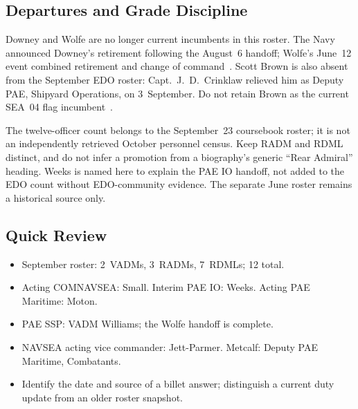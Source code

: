 \documentclass[../main.tex]{subfiles}
\begin{document}
\subsection{Departures and Grade Discipline}
Downey and Wolfe are no longer current incumbents in this roster. The Navy announced Downey's retirement following the August~6 handoff; Wolfe's June~12 event combined retirement and change of command~\autocite{DVIDS-Small-NAVSEA-Aug2026,DVIDS-SSP-Handoff-Jun2026}. Scott Brown is also absent from the September EDO roster: Capt.\ J.\ D.\ Crinklaw relieved him as Deputy PAE, Shipyard Operations, on 3~September. Do not retain Brown as the current SEA~04 flag incumbent~\autocite{DVIDS-Brown-Crinklaw-Sep2026}.

The twelve-officer count belongs to the September~23 coursebook roster; it is not an independently retrieved October personnel census. Keep RADM and RDML distinct, and do not infer a promotion from a biography's generic ``Rear Admiral'' heading. Weeks is named here to explain the PAE IO handoff, not added to the EDO count without EDO-community evidence. The separate June roster remains a historical source only.

\subsection{Quick Review}
\begin{itemize}
  \item September roster: 2~VADMs, 3~RADMs, 7~RDMLs; 12 total.
  \item Acting COMNAVSEA: Small. Interim PAE IO: Weeks. Acting PAE Maritime: Moton.
  \item PAE SSP: VADM Williams; the Wolfe handoff is complete.
  \item NAVSEA acting vice commander: Jett-Parmer. Metcalf: Deputy PAE Maritime, Combatants.
  \item Identify the date and source of a billet answer; distinguish a current duty update from an older roster snapshot.
\end{itemize}
\end{document}
